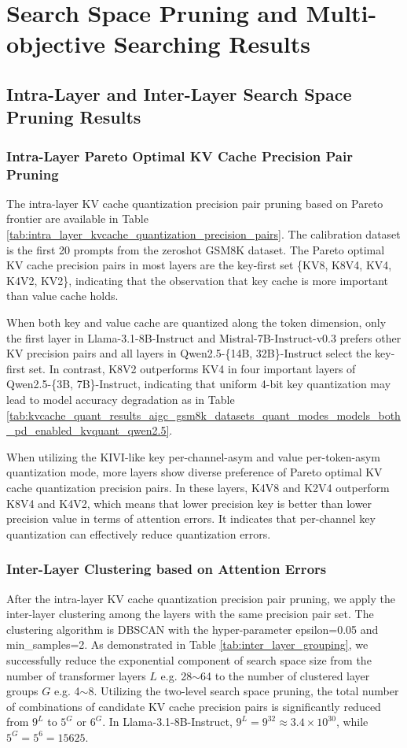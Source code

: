 \section{Search Space Pruning and Multi-objective Searching Results}
\subsection{Intra-Layer and Inter-Layer Search Space Pruning Results}
\label{sec:intra_layer_inter_layer_pruning_kvcache_quantization_precision_pairs}
\subsubsection{Intra-Layer Pareto Optimal KV Cache Precision Pair Pruning}
The intra-layer KV cache quantization precision pair pruning based on Pareto frontier are available in Table \ref{tab:intra_layer_kvcache_quantization_precision_pairs}. The calibration dataset is the first 20 prompts from the zeroshot GSM8K dataset. The Pareto optimal KV cache precision pairs in most layers are the key-first set \{KV8, K8V4, KV4, K4V2, KV2\}, indicating that the observation that key cache is more important than value cache holds. 

When both key and value cache are quantized along the token dimension, only the first layer in Llama-3.1-8B-Instruct and Mistral-7B-Instruct-v0.3 prefers other KV precision pairs and all layers in Qwen2.5-\{14B, 32B\}-Instruct select the key-first set. In contrast, K8V2 outperforms KV4 in four important layers of Qwen2.5-\{3B, 7B\}-Instruct, indicating that uniform 4-bit key quantization may lead to model accuracy degradation as in Table  \ref{tab:kvcache_quant_results_aigc_gsm8k_datasets_quant_modes_models_both_pd_enabled_kvquant_qwen2.5}. 

When utilizing the KIVI-like key per-channel-asym  and value per-token-asym quantization mode, more layers show diverse preference of Pareto optimal KV cache quantization precision pairs. In these layers, K4V8 and K2V4 outperform K8V4 and K4V2, which means that lower precision key is better than lower precision value in terms of attention errors. It indicates that per-channel key quantization can effectively reduce quantization errors. 

\subsubsection{Inter-Layer Clustering based on Attention Errors}
After the intra-layer KV cache quantization precision pair pruning, we apply the inter-layer clustering among the layers with the same precision pair set. The clustering algorithm is DBSCAN  \cite{ester1996dbscan} with the hyper-parameter epsilon=0.05 and min\_samples=2. As demonstrated in Table \ref{tab:inter_layer_grouping}, we successfully reduce the exponential component of search space size from the number of transformer layers $L$ e.g. 28$\sim$64 to the number of clustered layer groups $G$ e.g. 4$\sim$8. Utilizing the two-level search space pruning, the total number of combinations of candidate KV cache precision pairs is significantly reduced from $9^L$ to $5^G$ or $6^G$. In Llama-3.1-8B-Instruct, $9^L=9^{32} \approx 3.4\times10^{30}$, while $5^G=5^6=15625$.

